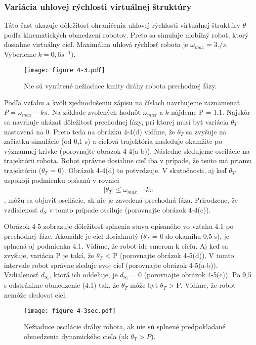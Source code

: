 \subsubsection{Variácia uhlovej rýchlosti virtuálnej štruktúry}
Táto časť ukazuje dôležitosť ohraničenia uhlovej rýchlosti virtuálnej štruktúry $ \theta $ 
podľa kinematických obmedzení robotov. Preto sa simuluje mobilný robot, ktorý dosiahne virtuálny cieľ. Maximálna uhlová rýchlosť robota je $ \omega_{max} = 3./s$. Vyberieme $k = 0,6s^{-1})$.
\begin{figure}[ht!] 
    \centering
    \texttt{[image: figure 4-3.pdf]}
    \caption{Nie sú vynútené nežiaduce kmity dráhy robota prechodnej fázy.}
    \label{o:43}
\end{figure}
\vspace{3mm}

\justifying
\noindent 
Podľa vzťahu a kvôli zjednodušeniu zápisu na číslach navrhujeme zaznamenať $ P = \omega_{max} - k \pi $. 
Na základe zvolených hodnôt $ \omega_{max} $ a $ k $ nájdeme P = 1,1. Najskôr sa navrhuje ukázať dôležitosť prechodnej fázy, 
pri ktorej musí byť variácia $ \theta_T $ nastavená na 0.
Preto teda na obrázku 4-4(d) vidíme, že $\theta_T$ sa zvyšuje na začiatku simulácie (od 0,1 s) a cieľová trajektória nasleduje okamžite po významnej krivke (porovnajte obrázok 4-4(a-b)). Následne sledujeme oscilácie na trajektórii robota. Robot správne dosiahne cieľ iba v prípade, že tento má priamu trajektóriu ($\theta_T$ = 0). Obrázok 4-4(d) to potvrdzuje. V skutočnosti, aj keď $\theta_T$ uspokojí podmienku opísanú v rovnici 
\begin{gather}\label{r:2}
    |\theta_T| \leq \omega_{max} - k\pi
\end{gather} 
, môžu sa objaviť oscilácie, ak nie je zavedená prechodná fáza. Prirodzene, že vzdialenosť $d_S$ v tomto prípade osciluje (porovnajte obrázok 4-4(c)).
\vspace{3mm}

\justifying
\noindent 
Obrázok 4-5 zobrazuje dôležitosť splnenia stavu opísaného vo vzťahu 4.1 po prechodnej fáze. Akonáhle je cieľ dosiahnutý ($\theta_T$ = 0 do okamihu 0,5 s), je splnená aj podmienka 4.1. Vidíme, že robot ide smerom k cieľu. Aj keď sa zvyšuje, variácia P je taká, že $\theta_T$ < P (porovnajte obrázok 4-5(d)). V tomto intervale robot správne sleduje svoj cieľ (porovnajte obrázok 4-5(a-b)). Vzdialenosť $d_{S_i}$, ktorá ich oddeľuje, je $d_{S_i}$ = 0 (porovnajte obrázok 4-5(c)). Po 9,5 s odstránime obmedzenie (4.1) tak, že $\theta_T$ môže byť $\theta_T$ > P. Vidíme, že robot nemôže sledovať cieľ.
\begin{figure}[ht!]
    \centering
    \texttt{[image: figure 4-3sec.pdf]}
    \caption{Nežiaduce oscilácie dráhy robota, ak nie sú splnené predpokladané obmedzenia dynamického cieľa (ak $\theta_T > P$).}
    \label{o:44}
\end{figure}

